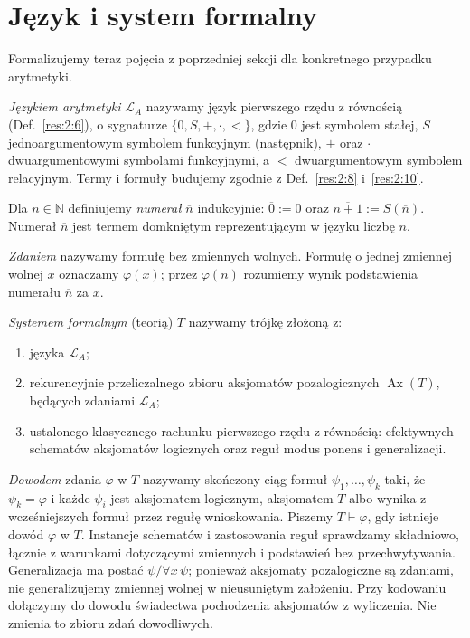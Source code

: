\section{Język i system formalny}\label{sec:system-formalny}
Formalizujemy teraz pojęcia z poprzedniej sekcji dla konkretnego przypadku arytmetyki.

\begin{definicja}\label{res:3:1}
\emph{Językiem arytmetyki} $\mathcal L_A$ nazywamy język pierwszego rzędu z równością (Def.~\ref{res:2:6}), o sygnaturze $\{0,S,+,\cdot,<\}$, gdzie $0$ jest symbolem stałej, $S$ jednoargumentowym symbolem funkcyjnym (następnik), $+$ oraz $\cdot$ dwuargumentowymi symbolami funkcyjnymi, a $<$ dwuargumentowym symbolem relacyjnym. Termy i formuły budujemy zgodnie z Def.~\ref{res:2:8} i~\ref{res:2:10}.
\end{definicja}

\begin{definicja}[Numerały]\label{res:3:2}
Dla $n\in\mathbb N$ definiujemy \emph{numerał} $\overline n$ indukcyjnie: $\overline0:=0$ oraz $\overline{n+1}:=S(\overline n)$. Numerał $\overline n$ jest termem domkniętym reprezentującym w języku liczbę $n$.
\end{definicja}

\begin{definicja}[Zdanie]\label{res:3:3}
\emph{Zdaniem} nazywamy formułę bez zmiennych wolnych. Formułę o jednej zmiennej wolnej $x$ oznaczamy $\varphi(x)$; przez $\varphi(\overline n)$ rozumiemy wynik podstawienia numerału $\overline n$ za $x$.
\end{definicja}

\begin{definicja}\label{res:3:4}
\emph{Systemem formalnym} (teorią) $T$ nazywamy trójkę złożoną z:
\begin{enumerate}[label=(\alph*)]
\item języka $\mathcal L_A$;
\item rekurencyjnie przeliczalnego zbioru aksjomatów pozalogicznych $\operatorname{Ax}(T)$, będących zdaniami $\mathcal L_A$;
\item ustalonego klasycznego rachunku pierwszego rzędu z równością: efektywnych schematów aksjomatów logicznych oraz reguł modus ponens i generalizacji.
\end{enumerate}
\emph{Dowodem} zdania $\varphi$ w $T$ nazywamy skończony ciąg formuł $\psi_1,\ldots,\psi_k$ taki, że $\psi_k=\varphi$ i każde $\psi_i$ jest aksjomatem logicznym, aksjomatem $T$ albo wynika z wcześniejszych formuł przez regułę wnioskowania. Piszemy $T\vdash\varphi$, gdy istnieje dowód $\varphi$ w $T$. Instancje schematów i zastosowania reguł sprawdzamy składniowo, łącznie z warunkami dotyczącymi zmiennych i podstawień bez przechwytywania. Generalizacja ma postać $\psi/\forall x\,\psi$; ponieważ aksjomaty pozalogiczne są zdaniami, nie generalizujemy zmiennej wolnej w nieusuniętym założeniu. Przy kodowaniu dołączymy do dowodu świadectwa pochodzenia aksjomatów z wyliczenia. Nie zmienia to zbioru zdań dowodliwych.
\end{definicja}

